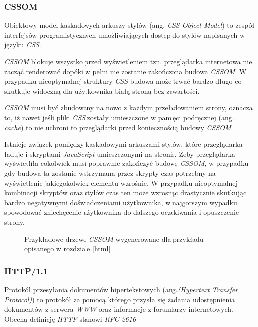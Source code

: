 \documentclass[polish, twoside, 12pt]{mwart}
\begin{document}
\subsubsection{CSSOM} \label{cssom}

Obiektowy model kaskadowych arkuszy stylów (ang. \emph{CSS Object Model}) to zespół interfejsów programistycznych umożliwiających dostęp do stylów napisanych w języku \emph{CSS}.

\emph{CSSOM} blokuje wszystko przed wyświetleniem tzn. przeglądarka internetowa nie zacząć renderować dopóki w pełni nie zostanie zakończona budowa \emph{CSSOM}. W przypadku nieoptymalnej struktury \emph{CSS} budowa może trwać bardzo długo co skutkuje widoczną dla użytkownika białą stroną bez zawartości.

\emph{CSSOM} musi być zbudowany na nowo z każdym przeładowaniem strony, oznacza to, iż nawet jeśli pliki \emph{CSS} zostały umieszczone w pamięci podręcznej (ang. \emph{cache}) to nie uchroni to przeglądarki przed koniecznością budowy \emph{CSSOM}.

Istnieje związek pomiędzy kaskadowymi arkuszami stylów, które przeglądarka ładuje i skryptami \emph{JavaScript} umieszczonymi na stronie. Żeby przeglądarka wyświetliła cokolwiek musi poprawnie zakończyć budowę \emph{CSSOM}, w przypadku gdy budowa ta zostanie wstrzymana przez skrypty czas potrzebny na wyświetlenie jakiegokolwiek elementu wzrośnie. W przypadku nieoptymalnej kombinacji skryptów oraz stylów czas ten może wzrosnąc drastycznie skutkując bardzo negatywnymi doświadczeniami użytkownika, w najgorszym wypadku spowodować zniechęcenie użytkownika do dalszego oczekiwania i opuszczenie strony.

\begin{figure}
  \centering
  \caption{Przykładowe drzewo \emph{CSSOM} wygenerowane dla przykładu opisanego w rozdziale \ref{html}}
\end{figure}
\subsubsection{HTTP/1.1} \label{http/1.1}

Protokół przesyłania dokumentów hipertekstowych (ang.\emph{(Hypertext Transfer Protocol)}) to protokół za pomocą którego przysła się żadania udostępnienia dokumentów z serwera \emph{WWW} oraz informacje z forumlarzy internetowych. Obecną definicję \emph{HTTP} stanowi \emph{RFC 2616} \cite{rfc2616}
\end{document}
